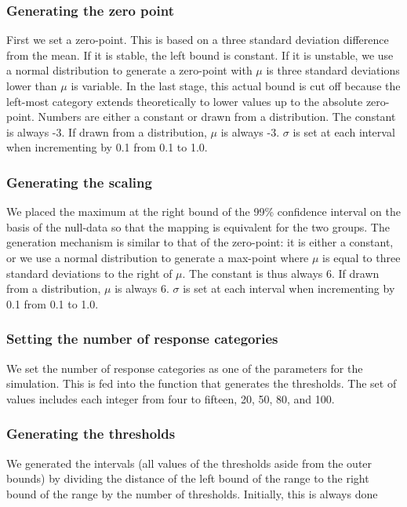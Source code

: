 \documentclass[utf8]{FrontiersinVancouver}
\begin{document}
\subsubsection{Generating the zero point}
First we set a zero-point. This is based on a three standard deviation difference from the mean. If it is stable, the left bound is constant. If it is unstable, we use a normal distribution to generate a zero-point with $\mu$ is three standard deviations lower than $\mu$ is variable. In the last stage, this actual bound is cut off because the left-most category extends theoretically to lower values up to the absolute zero-point. Numbers are either a constant or drawn from a distribution. The constant is always -3. If drawn from a distribution, $\mu$ is always -3. $\sigma$ is set at each interval when incrementing by 0.1 from 0.1 to 1.0.

\subsubsection{Generating the scaling}
We placed the maximum at the right bound of the 99\% confidence interval on the basis of the null-data so that the mapping is equivalent for the two groups. The generation mechanism is similar to that of the zero-point: it is either a constant, or we use a normal distribution to generate a max-point where $\mu$ is equal to three standard deviations to the right of $\mu$. The constant is thus always 6. If drawn from a distribution, $\mu$ is always 6. $\sigma$ is set at each interval when incrementing by 0.1 from 0.1 to 1.0.

\subsubsection{Setting the number of response categories}
We set the number of response categories as one of the parameters for the simulation. This is fed into the function that generates the thresholds. The set of values includes each integer from four to fifteen, 20, 50, 80, and 100.

\subsubsection{Generating the thresholds}
We generated the intervals (all values of the thresholds aside from the outer bounds) by dividing the distance of the left bound of the range to the right bound of the range by the number of thresholds. Initially, this is always done 
\end{document}
